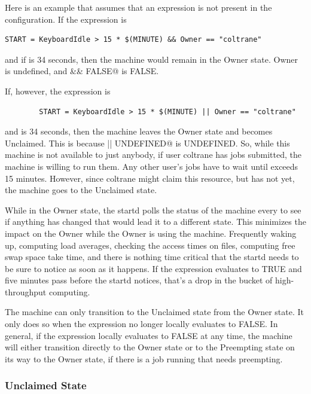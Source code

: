 Here is an example that assumes that an 
expression is not present in the configuration.
If the  expression is
\begin{verbatim}
START = KeyboardIdle > 15 * $(MINUTE) && Owner == "coltrane" 
\end{verbatim}
and if  is 34 seconds,
then the machine would remain in the Owner state.
Owner is undefined, and
\verb@anything && FALSE@ is FALSE.

If, however, the  expression is
\begin{verbatim}
        START = KeyboardIdle > 15 * $(MINUTE) || Owner == "coltrane"
\end{verbatim}
and  is 34 seconds, then the machine
leaves the Owner state and becomes Unclaimed.
This is because
\verb@FALSE || UNDEFINED@ is UNDEFINED.
So, while this machine is not available to just anybody,
if user coltrane has jobs submitted, the machine is willing to run them.
Any other user's jobs have to wait
until  exceeds 15 minutes.
However, since coltrane might claim this resource,
but has not yet, the machine goes to the Unclaimed state.

While in the Owner state, the startd polls the status of the
machine every  to see if anything has changed
that would lead it to a different state.
This minimizes the impact on the Owner
while the Owner is using the machine.
Frequently waking up, computing load averages, checking the access
times on files, computing free swap space take time,
and there is nothing
time critical that the startd needs to be sure to notice as soon as it
happens.
If the  expression evaluates to TRUE and five
minutes pass before the startd notices,
that's a drop in the bucket of high-throughput computing.

The machine can only transition to the Unclaimed state from the Owner state.
It only does so when the  expression no longer locally
evaluates to FALSE.
In general, if the 
expression locally evaluates to FALSE at any time,
the machine will either transition directly to the Owner state
or to the Preempting state on its way to the Owner state,
if there is a job running that needs preempting.

\subsubsection{\label{sec:Unclaimed-State}Unclaimed State}

